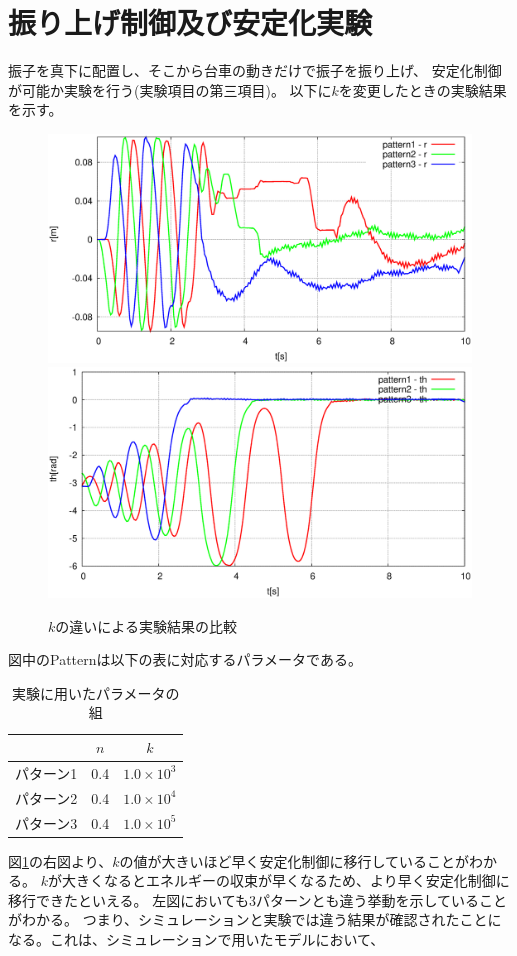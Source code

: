\section{振り上げ制御及び安定化実験}
	振子を真下に配置し、そこから台車の動きだけで振子を振り上げ、
	安定化制御が可能か実験を行う(実験項目の第三項目)。
	以下に$k$を変更したときの実験結果を示す。
	\begin{figure}[H]
		\centering
		\includegraphics[width=0.49\linewidth]{gazo/Hexpe_R.eps}
		\includegraphics[width=0.49\linewidth]{gazo/Hexpe_TH.eps}
		\caption{$k$の違いによる実験結果の比較}
		\label{image:Hexpe}
	\end{figure}
	図中のPatternは以下の表に対応するパラメータである。
	\begin{table}[H]
		\begin{center}
			\caption{実験に用いたパラメータの組}
			\medskip
			
			\begin{tabular}{|c|c|c|}\hline
				& $n$ & $k$ \\ \hline\hline
				パターン1 & 0.4 & $1.0×10^3$  \\ \hline
				パターン2 & 0.4 & $1.0×10^4$  \\ \hline
				パターン3 & 0.4 & $1.0×10^5$  \\ \hline
			\end{tabular}
		\end{center}
		\label{table:huriage_huriage}
	\end{table}
	図\ref{image:Hexpe}の右図より、$k$の値が大きいほど早く安定化制御に移行していることがわかる。
	$k$が大きくなるとエネルギーの収束が早くなるため、より早く安定化制御に移行できたといえる。
	左図においても3パターンとも違う挙動を示していることがわかる。
	つまり、シミュレーションと実験では違う結果が確認されたことになる。これは、シミュレーションで用いたモデルにおいて、
